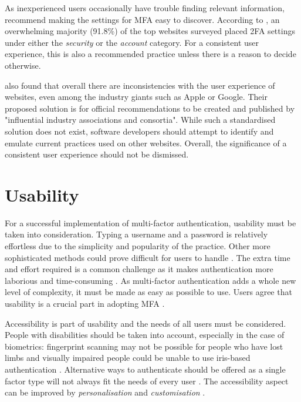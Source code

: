 As inexperienced users occasionally have trouble finding relevant information, \textcite[5447]{das_mfa_2020} recommend making the settings for MFA easy to discover. According to \textcite[10]{lyastani_systematic_2023}, an overwhelming majority (91.8\%) of the top websites surveyed placed 2FA settings under either the \textit{security} or the \textit{account} category. For a consistent user experience, this is also a recommended practice unless there is a reason to decide otherwise.

\textcite[12]{lyastani_systematic_2023} also found that overall there are inconsistencies with the user experience of websites, even among the industry giants such as Apple or Google. Their proposed solution is for official recommendations to be created and published by "influential industry associations and consortia". While such a standardised solution does not exist, software developers should attempt to identify and emulate current practices used on other websites. Overall, the significance of a consistent user experience should not be dismissed.


\section{Usability}

For a successful implementation of multi-factor authentication, usability must be taken into consideration. Typing a username and a password is relatively effortless due to the simplicity and popularity of the practice. Other more sophisticated methods could prove difficult for users to handle \citep{bonneau_quest_2012}. The extra time and effort required is a common challenge as it makes authentication more laborious and time-consuming \citep[110]{golla_driving_2021}. As multi-factor authentication adds a whole new level of complexity, it must be made as easy as possible to use. Users agree that usability is a crucial part in adopting MFA \citep[13]{marky_nah_2022}.

Accessibility is part of usability and the needs of all users must be considered. People with disabilities should be taken into account, especially in the case of biometrics: fingerprint scanning may not be possible for people who have lost limbs and visually impaired people could be unable to use iris-based authentication \citep[9]{ometov_multi-factor_2018}. Alternative ways to authenticate should be offered as a single factor type will not always fit the needs of every user \citep[51]{grassi_digital_2017}. The accessibility aspect can be improved by \textit{personalisation} and \textit{customisation} \citep[22]{marky_nah_2022}.

